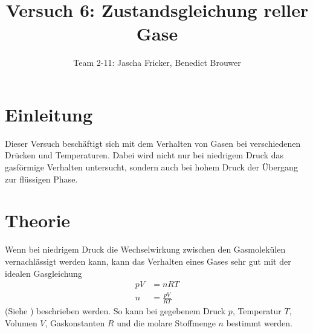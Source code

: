 \documentclass[11pt, a4paper]{article}
\title{Versuch 6: Zustandsgleichung reller Gase}
\author{Team 2-11: Jascha Fricker, Benedict Brouwer}
\begin{document}
    \maketitle

    

   

    \tableofcontents

    \newpage
    
    \section{Einleitung}
        Dieser Versuch beschäftigt sich mit dem Verhalten von Gasen bei verschiedenen Drücken und Temperaturen.
        Dabei wird nicht nur bei niedrigem Druck das gasförmige Verhalten untersucht, sondern auch bei hohem Druck
        der Übergang zur flüssigen Phase.

    \section{Theorie}
    Wenn bei niedrigem Druck die Wechselwirkung zwischen den Gasmolekülen vernachlässigt werden kann,
    kann das Verhalten eines Gases sehr gut mit der idealen Gasgleichung
    \begin{align}
        p V &= n R T \nonumber \nonumber\\
        n &= \frac{p V}{R T} \label{eq:ideal}
    \end{align}
    (Siehe \cite[(1)]{ZUS}) beschrieben werden. So kann bei gegebenem Druck $p$, Temperatur $T$, Volumen $V$,
    Gaskonstanten $R$ und die molare Stoffmenge $n$ bestimmt werden. \\
\end{document}
